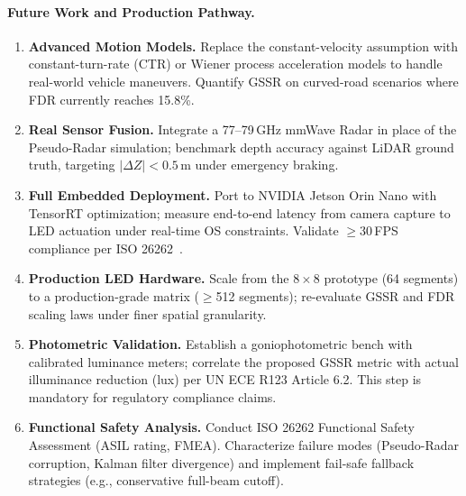 \documentclass[pdflatex,sn-mathphys-num]{sn-jnl}%
\theoremstyle{thmstyleone}%
\theoremstyle{thmstyletwo}%
\theoremstyle{thmstylethree}%
\begin{document}
\paragraph{Future Work and Production Pathway.}
\begin{enumerate}[label=\textbf{(\roman*)},leftmargin=*]
  \item \textbf{Advanced Motion Models.} Replace the constant-velocity
    assumption with constant-turn-rate (CTR) or Wiener process
    acceleration models to handle real-world vehicle maneuvers.
    Quantify GSSR on curved-road scenarios where FDR currently reaches
    15.8\%.
  \item \textbf{Real Sensor Fusion.} Integrate a 77--79\,GHz mmWave
    Radar in place of the Pseudo-Radar simulation; benchmark depth
    accuracy against LiDAR ground truth, targeting $|\Delta Z| < 0.5$\,m
    under emergency braking.
  \item \textbf{Full Embedded Deployment.} Port to NVIDIA Jetson Orin
    Nano with TensorRT optimization; measure end-to-end latency from
    camera capture to LED actuation under real-time OS constraints.
    Validate $\geq$30\,FPS compliance per ISO 26262~\cite{ISO26262_2018}.
  \item \textbf{Production LED Hardware.} Scale from the $8\times8$
    prototype (64 segments) to a production-grade matrix
    ($\geq$512 segments); re-evaluate GSSR and FDR scaling laws under
    finer spatial granularity.
  \item \textbf{Photometric Validation.} Establish a goniophotometric
    bench with calibrated luminance meters; correlate the proposed GSSR
    metric with actual illuminance reduction (lux) per UN ECE R123
    Article 6.2. This step is mandatory for regulatory compliance claims.
  \item \textbf{Functional Safety Analysis.} Conduct ISO 26262
    Functional Safety Assessment (ASIL rating, FMEA). Characterize
    failure modes (Pseudo-Radar corruption, Kalman filter divergence)
    and implement fail-safe fallback strategies (e.g., conservative
    full-beam cutoff).
\end{enumerate}





\end{document}

